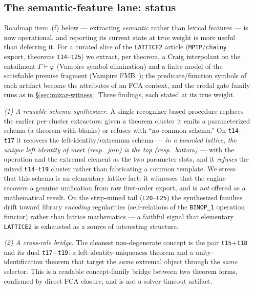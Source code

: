 \documentclass[]{article}
\newcommand{\lid}[1]{{\ttfamily\nolinkurl{#1}}}
\begin{document}
\subsection{The semantic-feature lane: status}\label{sec:mizar-semantic}

Roadmap item~(f) below --- extracting \emph{semantic} rather than lexical features
--- is now operational, and reporting its current state at true weight is more
useful than deferring it. For a curated slice of the \lid{LATTICE2} article
(\lid{MPTP}/\lid{chainy} export, theorems \lid{t14}--\lid{t25}) we extract, per
theorem, a Craig interpolant on the entailment $\Gamma \vdash \varphi$ (Vampire
symbol elimination) and a finite model of the satisfiable premise fragment (Vampire
FMB~\cite{vampire-fmb}); the predicate/function symbols of each artifact become the
attributes of an FCA context, and the credal gate family runs as in
\S\ref{sec:mizar-witness}. Three findings, each stated at its true weight.

\emph{(1) A reusable schema synthesizer.} A single recognizer-based procedure
replaces the earlier per-cluster extractors: given a theorem cluster it emits a
parameterized schema (a theorem-with-blanks) or refuses with ``no common schema.''
On \lid{t14}--\lid{t17} it recovers the left-identity/extremum schema --- \emph{in a
bounded lattice, the unique left identity of meet (resp.\ join) is the top (resp.\
bottom)} --- with the operation and the extremal element as the two parameter slots,
and it \emph{refuses} the mixed \lid{t14}--\lid{t19} cluster rather than fabricating
a common template. We stress that this schema is an elementary lattice fact: it
witnesses that the engine recovers a genuine unification from raw first-order export,
and is \emph{not} offered as a mathematical result. On the strip-mined tail
(\lid{t20}--\lid{t25}) the synthesized families drift toward library
\emph{encoding} regularities (self-relations of the \lid{BINOP\_1} operation
functor) rather than lattice mathematics --- a faithful signal that elementary
\lid{LATTICE2} is exhausted as a source of interesting structure.

\emph{(2) A cross-role bridge.} The cleanest non-degenerate concept is the pair
\lid{t15}+\lid{t18} and its dual \lid{t17}+\lid{t19}: a
left-identity-uniqueness theorem and a unity-identification theorem that target the
\emph{same} extremal object through the \emph{same} selector. This is a readable
concept-family bridge between two theorem forms, confirmed by direct FCA closure,
and is not a solver-timeout artifact.
\end{document}
